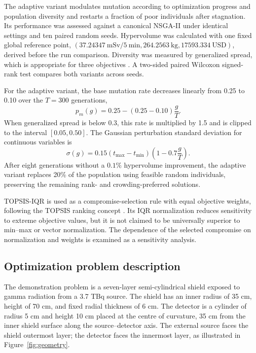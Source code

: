 \documentclass[preprint,12pt]{elsarticle}
\begin{document}
The adaptive variant modulates mutation according to optimization progress and population diversity and restarts a fraction of poor individuals after stagnation. Its performance was assessed against a canonical NSGA-II under identical settings and ten paired random seeds. Hypervolume was calculated with one fixed global reference point, $(37.24347\ \mathrm{mSv/5\ min}, 264.2563\ \mathrm{kg}, 17593.334\ \mathrm{USD})$, derived before the run comparison. Diversity was measured by generalized spread, which is appropriate for three objectives \citep{Zhou2006}. A two-sided paired Wilcoxon signed-rank test compares both variants across seeds.

For the adaptive variant, the base mutation rate decreases linearly from 0.25 to 0.10 over the $T=300$ generations,
\begin{equation}
p_m(g)=0.25-(0.25-0.10)\frac{g}{T}.
\label{eq:mutation-rate}
\end{equation}
When generalized spread is below 0.3, this rate is multiplied by 1.5 and is clipped to the interval $[0.05,0.50]$. The Gaussian perturbation standard deviation for continuous variables is
\begin{equation}
\sigma(g)=0.15(t_{\max}-t_{\min})\left(1-0.7\frac{g}{T}\right).
\label{eq:mutation-strength}
\end{equation}
After eight generations without a $0.1\%$ hypervolume improvement, the adaptive variant replaces 20\% of the population using feasible random individuals, preserving the remaining rank- and crowding-preferred solutions.

TOPSIS-IQR is used as a compromise-selection rule with equal objective weights, following the TOPSIS ranking concept \citep{HwangYoon1981}. Its IQR normalization reduces sensitivity to extreme objective values, but it is not claimed to be universally superior to min--max or vector normalization. The dependence of the selected compromise on normalization and weights is examined as a sensitivity analysis.

\subsection{Optimization problem description}\label{sec:problem}
The demonstration problem is a seven-layer semi-cylindrical shield exposed to gamma radiation from a 3.7 TBq  source. The shield has an inner radius of 35 cm, height of 70 cm, and fixed radial thickness of 6 cm. The detector is a cylinder of radius 5 cm and height 10 cm placed at the centre of curvature, 35 cm from the inner shield surface along the source--detector axis. The external source faces the shield outermost layer; the detector faces the innermost layer, as illustrated in Figure~\ref{fig:geometry}.
\end{document}
